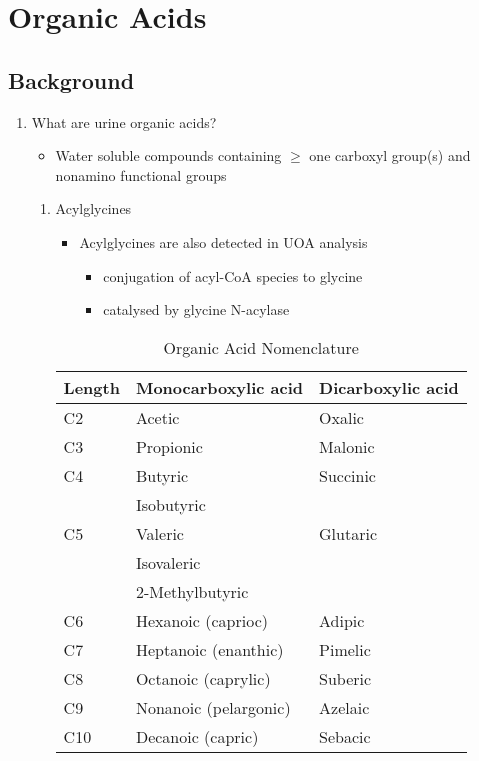 \documentclass{scrartcl}
\begin{document}
\section{Organic Acids}
\label{sec:org35bea69}
\subsection{Background}
\label{sec:org4ef043a}
\begin{enumerate}
\item What are urine organic acids?
\label{sec:org64a609a}
\begin{itemize}
\item Water soluble compounds containing \(\ge\) one carboxyl group(s) and
nonamino functional groups
\end{itemize}

\centering
{}
\begin{enumerate}
\item Acylglycines
\label{sec:orgf55574b}
\begin{itemize}
\item Acylglycines are also detected in UOA analysis
\begin{itemize}
\item conjugation of acyl-CoA species to glycine
\item catalysed by glycine N-acylase
\end{itemize}
\end{itemize}

\begin{table}[htbp]
\caption{\label{tab:org770613c}
Organic Acid Nomenclature}
\centering
\begin{tabular}{lll}
Length & Monocarboxylic acid & Dicarboxylic acid\\
\hline
C2 & Acetic & Oxalic\\
C3 & Propionic & Malonic\\
C4 & Butyric & Succinic\\
 & Isobutyric & \\
C5 & Valeric & Glutaric\\
 & Isovaleric & \\
 & 2-Methylbutyric & \\
C6 & Hexanoic (caprioc) & Adipic\\
C7 & Heptanoic (enanthic) & Pimelic\\
C8 & Octanoic (caprylic) & Suberic\\
C9 & Nonanoic (pelargonic) & Azelaic\\
C10 & Decanoic (capric) & Sebacic\\
\end{tabular}
\end{table}
\end{enumerate}



\end{enumerate}
\end{document}

